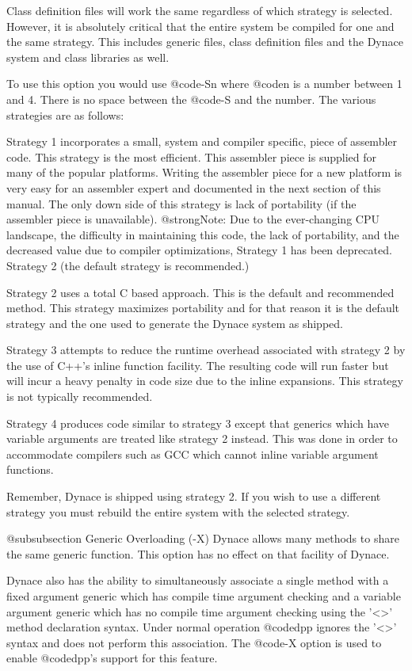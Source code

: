 Class definition files will work the same regardless of which strategy
is selected.  However, it is absolutely critical that the entire system
be compiled for one and the same strategy.  This includes generic files,
class definition files and the Dynace system and class libraries as well.

To use this option you would use @code{-Sn} where @code{n} is a number
between 1 and 4.  There is no space between the @code{-S} and the number.
The various strategies are as follows:

Strategy 1 incorporates a small, system and compiler specific, piece
of assembler code.  This strategy is the most efficient.  This
assembler piece is supplied for many of the popular platforms.
Writing the assembler piece for a new platform is very easy for an
assembler expert and documented in the next section of this manual.
The only down side of this strategy is lack of portability (if the
assembler piece is unavailable). @strong{Note:} Due to the ever-changing
CPU landscape, the difficulty in maintaining this code, the lack of portability,
and the decreased value due to compiler optimizations, Strategy 1 has
been deprecated.  Strategy 2 (the default strategy is recommended.)


Strategy 2 uses a total C based approach.  This is the default and
recommended method.  This strategy maximizes portability and for that
reason it is the default strategy and the one used to generate the
Dynace system as shipped.  

Strategy 3 attempts to reduce the runtime overhead associated with
strategy 2 by the use of C++'s inline function facility.  The resulting
code will run faster but will incur a heavy penalty in code size due
to the inline expansions.  This strategy is not typically recommended.

Strategy 4 produces code similar to strategy 3 except that generics
which have variable arguments are treated like strategy 2 instead.
This was done in order to accommodate compilers such as GCC which
cannot inline variable argument functions.

Remember, Dynace is shipped using strategy 2.  If you wish to use a
different strategy you must rebuild the entire system with the selected
strategy.

@subsubsection Generic Overloading (-X)
Dynace allows many methods to share the same generic function.  This
option has no effect on that facility of Dynace.

Dynace also has the ability to simultaneously associate a single method
with a fixed argument generic which has compile time argument checking
and a variable argument generic which has no compile time argument
checking using the '<>' method declaration syntax.  Under normal
operation @code{dpp} ignores the '<>' syntax and does not perform
this association.  The @code{-X} option is used to enable @code{dpp}'s
support for this feature.

